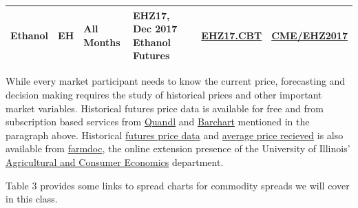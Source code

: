 \documentclass[]{book}
\theoremstyle{definition}
\theoremstyle{definition}
\theoremstyle{remark}
\begin{document}
\begin{longtable}[]{@{}lcllll@{}}
\begin{minipage}[t]{0.07\columnwidth}
Ethanol\strut
\end{minipage} & \begin{minipage}[t]{0.07\columnwidth}\centering\strut
EH\strut
\end{minipage} & \begin{minipage}[t]{0.32\columnwidth}\raggedright\strut
All Months\strut
\end{minipage} & \begin{minipage}[t]{0.13\columnwidth}\raggedright\strut
EHZ17, Dec 2017 Ethanol Futures\strut
\end{minipage} & \begin{minipage}[t]{0.13\columnwidth}\raggedright\strut
\href{https://finance.yahoo.com/quote/EHZ17-2.CBT/futures?p=EHZ17-2.CBT}{EHZ17.CBT}\strut
\end{minipage} & \begin{minipage}[t]{0.13\columnwidth}\raggedright\strut
\href{https://www.quandl.com/data/CME/EHZ2017-Ethanol-Futures-December-2017-EHZ2017}{CME/EHZ2017}\strut
\end{minipage}\tabularnewline
\bottomrule
\end{longtable}

While every market participant needs to know the current price,
forecasting and decision making requires the study of historical prices
and other important market variables. Historical futures price data is
available for free and from subscription based services from
\href{https://quandl.com}{Quandl} and
\href{https://barchart.com}{Barchart} mentioned in the paragraph above.
Historical
\href{http://farmdoc.agricharts.com/markets/historic.php}{futures price
data} and
\href{http://www.farmdoc.illinois.edu/manage/pricehistory/price_history.html}{average
price recieved} is also available from
\href{http://www.farmdoc.illinois.edu}{farmdoc}, the online extension
presence of the University of Illinois'
\href{http://ace.illinois.edu/}{Agricultural and Consumer Economics}
department.

Table 3 provides some links to spread charts for commodity spreads we
will cover in this class.
\end{document}
